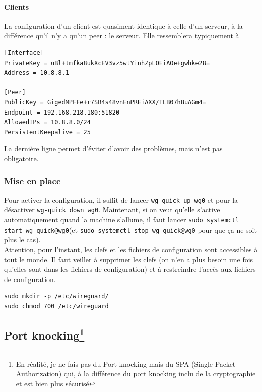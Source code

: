 \documentclass[a4paper, 12pt]{article}
\begin{document}
\paragraph{Clients}
La configuration d'un client est quasiment identique à celle d'un serveur, à la différence qu'il n'y a qu'un peer : le serveur. Elle ressemblera typiquement à 

\begin{lstlisting}[language = shell]
[Interface]
PrivateKey = uBl+tmfka8ukXcEV3vz5wtYinhZpLOEiAOe+gwhke28=
Address = 10.8.8.1

[Peer]
PublicKey = GigedMPFFe+r7SB4s48vnEnPREiAXX/TLB07hBuAGm4= 
Endpoint = 192.168.218.180:51820
AllowedIPs = 10.8.8.0/24
PersistentKeepalive = 25
\end{lstlisting}
La dernière ligne permet d'éviter d'avoir des problèmes, mais n'est pas obligatoire.
\subsubsection{Mise en place}
Pour activer la configuration, il suffit de lancer \verb+wg-quick up wg0+ et pour la désactiver \verb+wg-quick down wg0+. Maintenant, si on veut qu'elle s'active automatiquement quand la machine s'allume, il faut lancer \verb+sudo systemctl start wg-quick@wg0+(et \verb+sudo systemctl stop wg-quick@wg0+ pour que ça ne soit plus le cas). \\

Attention, pour l'instant, les clefs et les fichiers de configuration sont accessibles à tout le monde. Il faut veiller à supprimer les clefs (on n'en a plus besoin une fois qu'elles sont dans les fichiers de configuration) et à restreindre l'accès aux fichiers de configuration. 

\begin{center}
\begin{minipage}{.51\linewidth}
\begin{lstlisting}[language = shell]
sudo mkdir -p /etc/wireguard/
sudo chmod 700 /etc/wireguard
\end{lstlisting}
\end{minipage}
\end{center}

\subsection{Port knocking\protect\footnote{En réalité, je ne fais pas du Port knocking mais du SPA (Single Packet Authorization)  qui, à la différence du port knocking inclu de la cryptographie et est bien plus sécurisé}}
\end{document}
